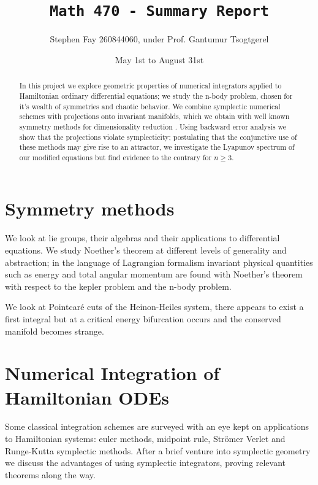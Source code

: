 \documentclass[12pt]{article}
\begin{document}
\title{\texttt{Math 470 - Summary Report}}
\author{Stephen Fay 260844060, under Prof. Gantumur Tsogtgerel}
\date{May 1st to August 31st}
\maketitle

\begin{abstract}
In this project we explore geometric properties of numerical integrators applied to Hamiltonian ordinary differential equations; we study the n-body problem, chosen for it's wealth of symmetries and chaotic behavior. We combine symplectic numerical schemes \cite{Numerical} with projections onto invariant manifolds, which we obtain with well known symmetry methods for dimensionality reduction \cite{Symmetry-methods}. Using backward error analysis we show that the projections violate symplecticity; postulating that the conjunctive use of these methods may give rise to an attractor, we investigate the Lyapunov spectrum of our modified equations but find evidence to the contrary for $n\geq 3$. 
\end{abstract}

\section{Symmetry methods}
We look at lie groups, their algebras and their applications to differential equations. We study Noether's theorem at different levels of generality and abstraction; in the language of Lagrangian formalism invariant physical quantities such as energy and total angular momentum are found with Noether's theorem with respect to the kepler problem and the n-body problem. 

We look at Pointcar\'e cuts of the Heinon-Heiles system, there appears to exist a first integral but at a critical energy bifurcation occurs and the conserved manifold becomes strange. 

\section{Numerical Integration of Hamiltonian ODEs}
Some classical integration schemes are surveyed with an eye kept on applications to Hamiltonian systems: euler methods, midpoint rule, Str\"omer Verlet and Runge-Kutta symplectic methods. After a brief venture into symplectic geometry we discuss the advantages of using symplectic integrators, proving relevant theorems along the way. 
\end{document}
